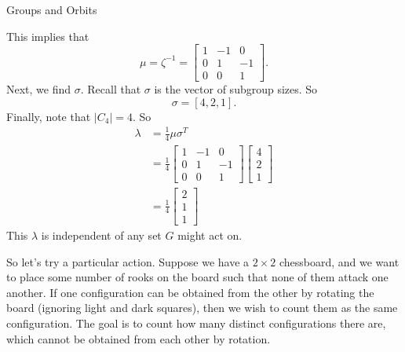 \documentclass[12pt]{pom_thesis}
\begin{document}
\begin{chapter}{Groups and Orbits}
\begin{examp}
This implies that
\[
\mu = \zeta^{-1} = \begin{bmatrix} 1 & -1 & 0\\ 0 & 1 & -1 \\ 0 & 0 & 1 \end{bmatrix}.
\]
Next, we find $\sigma$. Recall that $\sigma$ is the vector of subgroup sizes. So 
\[
\sigma = [4, 2, 1].
\]
Finally, note that $|C_4|=4$. So
\begin{align*}
\lambda &= \frac 14 \mu \sigma^T\\
&= \frac 14 
\begin{bmatrix} 1 & -1 & 0\\ 0 & 1 & -1 \\ 0 & 0 & 1 \end{bmatrix}
\begin{bmatrix} 4 \\ 2 \\ 1 \end{bmatrix}\\
&= \frac 14 \begin{bmatrix} 2 \\ 1 \\ 1\end{bmatrix}
\end{align*}
This $\lambda$ is independent of any set $G$ might act on. 

So let's try a particular action. Suppose we have a $2 \times 2$ chessboard, and we want to place some number of rooks on the board such that none of them attack one another. If one configuration can be obtained from the other by rotating the board (ignoring light and dark squares), then we wish to count them as the same configuration. The goal is to count how many distinct configurations there are, which cannot be obtained from each other by rotation.


\end{examp}
\end{chapter}
\end{document}
